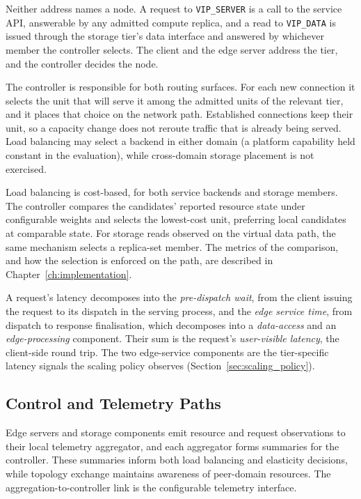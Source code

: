 ﻿\documentclass[12pt,reqno,twoside]{amsbook}
\begin{document}
Neither address names a node. A request to \texttt{VIP\_SERVER} is a call
to the service API, answerable by any admitted compute replica, and a read
to \texttt{VIP\_DATA} is issued through the storage tier's data interface and
answered by whichever member the controller selects. The client and the edge
server address the tier, and the controller decides the node.

The controller is responsible for both routing surfaces. For each new
connection it selects the unit that will serve it among the admitted units of
the relevant tier, and it places that choice on the network path. Established
connections keep their unit, so a capacity change does not reroute traffic
that is already being served. Load balancing may select a backend in either
domain (a platform capability held constant in the evaluation), while
cross-domain storage placement is not exercised.

Load balancing is cost-based, for both service backends and storage
members. The controller compares the candidates' reported resource state
under configurable weights and selects the lowest-cost unit, preferring local
candidates at comparable state. For storage reads observed on the virtual
data path, the same mechanism selects a replica-set member. The metrics of
the comparison, and how the selection is enforced on the path, are described
in Chapter~\ref{ch:implementation}.

A request's latency decomposes into the \emph{pre-dispatch wait}, from the
client issuing the request to its dispatch in the serving process, and the
\emph{edge service time}, from dispatch to response finalisation, which
decomposes into a \emph{data-access} and an \emph{edge-processing}
component. Their sum is the request's \emph{user-visible latency}, the
client-side round trip. The two edge-service components are the
tier-specific latency signals the scaling policy observes
(Section~\ref{sec:scaling_policy}).

\subsection{Control and Telemetry Paths}\label{sec:control_paths}
Edge servers and storage components emit resource and request observations to
their local telemetry aggregator, and each aggregator forms
summaries for the controller. These summaries inform both load
balancing and elasticity decisions, while topology exchange
maintains awareness of peer-domain resources.
The aggregation-to-controller link is the configurable telemetry
interface.
\end{document}
